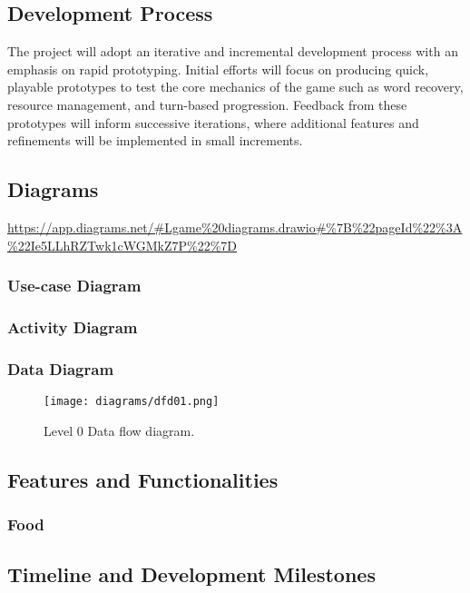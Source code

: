 \documentclass[11pt]{article}
\begin{document}
\subsection{Development Process}
The project will adopt an iterative and incremental development process with an emphasis on rapid prototyping. 
Initial efforts will focus on producing quick, playable prototypes to test the core mechanics of the game such as word recovery, resource management, and turn-based progression. 
Feedback from these prototypes will inform successive iterations, where additional features and refinements will be implemented in small increments. 

\subsection{Diagrams}
\url{https://app.diagrams.net/#Lgame%20diagrams.drawio#%7B%22pageId%22%3A%22Ie5LLhRZTwk1cWGMkZ7P%22%7D}

\subsubsection{Use-case Diagram}
\subsubsection{Activity Diagram}
\subsubsection{Data Diagram}

\begin{figure}[h!]
  \centering
  \texttt{[image: diagrams/dfd01.png]}
  \caption{Level 0 Data flow diagram.}
  \label{fig:dfd0}
\end{figure}

\subsection{Features and Functionalities}
\subsubsection{Food}


\subsection{Timeline and Development Milestones}
\end{document}
